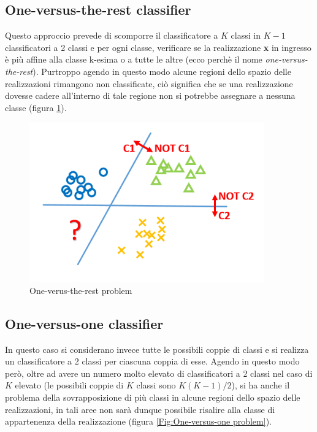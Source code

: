 \subsection{One-versus-the-rest classifier} 
Questo approccio prevede di scomporre il classificatore a $K$ classi in $K-1$ classificatori a 2 classi e per ogni classe, verificare se la realizzazione \textbf{x} in ingresso \`{e} pi\`{u} affine alla classe k-esima o a tutte le altre (ecco perch\`{e} il nome \emph{one-versus-the-rest}). Purtroppo agendo in questo modo alcune regioni dello spazio delle realizzazioni rimangono non classificate, ci\`{o} significa che se una realizzazione dovesse cadere all'interno di tale regione non si potrebbe assegnare a nessuna classe (figura \ref{Fig:One-verus-the-rest problem}).

\begin{figure}[h]
	
	\centering
	\includegraphics[width=0.9\textwidth]{Immagini/OVTR}
	\caption{One-verus-the-rest problem
		\label{Fig:One-verus-the-rest problem}}
\end{figure}

\subsection{One-versus-one classifier}
In questo caso si considerano invece tutte le possibili coppie di classi e si realizza un classificatore a 2 classi per ciascuna coppia di esse. Agendo in questo modo per\`{o}, oltre ad avere un numero molto elevato di classificatori a 2 classi nel caso di $K$ elevato (le possibili coppie di $K$ classi sono $K(K-1)/2$), si ha anche il problema della sovrapposizione di pi\`{u} classi in alcune regioni dello spazio delle realizzazioni, in tali aree non sar\`{a} dunque possibile risalire alla classe di appartenenza della realizzazione (figura \ref{Fig:One-versus-one problem}).

